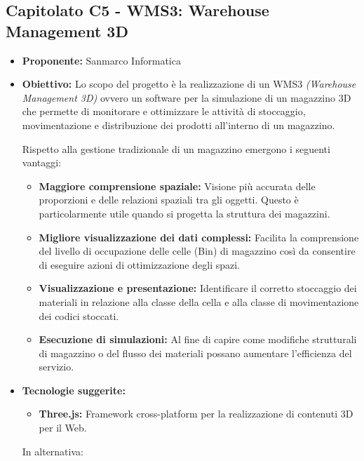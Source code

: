 \documentclass{article}
\begin{document}

\subsection{\textbf{Capitolato C5} - WMS3: Warehouse Management 3D}
\begin{itemize}
    \item[] \textbf{Proponente:} Sanmarco Informatica
        
    \item[] \textbf{Obiettivo:} Lo scopo del progetto è la realizzazione di un WMS3 \textit{(Warehouse Management 3D)} ovvero un software per la simulazione di un magazzino 3D che permette di monitorare e ottimizzare le attività di stoccaggio, movimentazione e distribuzione dei prodotti all'interno di un magazzino. 
    
    Rispetto alla gestione tradizionale di un magazzino emergono i seguenti vantaggi:
    \begin{itemize}
        \item \textbf{Maggiore comprensione spaziale:} Visione più accurata delle proporzioni e delle relazioni spaziali tra gli oggetti. Questo è particolarmente utile quando si progetta la struttura dei magazzini.
        \item \textbf{Migliore visualizzazione dei dati complessi:} Facilita la comprensione del livello di occupazione delle celle (Bin) di magazzino così da consentire di eseguire azioni di ottimizzazione degli spazi.
        \item \textbf{Visualizzazione e presentazione:} Identificare il corretto stoccaggio dei materiali in relazione alla classe della cella e alla classe di movimentazione dei codici stoccati. 
        \item \textbf{Esecuzione di simulazioni:} Al fine di capire come modifiche strutturali di magazzino o del flusso dei materiali possano aumentare l'efficienza del servizio.
    \end{itemize}

    \item[] \textbf{Tecnologie suggerite:}
    \begin{itemize}
        \item \textbf{Three.js:} Framework cross-platform per la realizzazione di contenuti 3D per il Web.
    \end {itemize}

    In alternativa:


\end{itemize}
\end{document}
